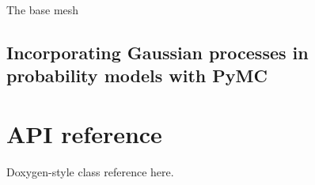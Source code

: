 \documentclass{manual}
\begin{document}
The base mesh



\section{Incorporating Gaussian processes in probability models with PyMC}\label{sec:PyMC} %



\chapter{API reference}\label{cha:reference} 

Doxygen-style class reference here.
\end{document}
